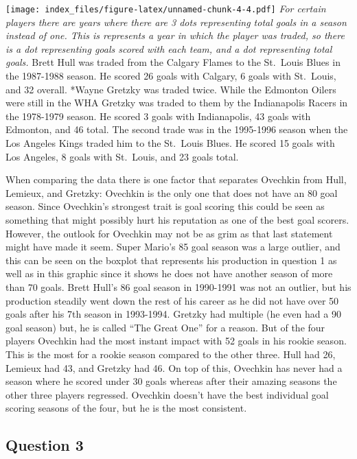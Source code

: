 \documentclass[
]{article}
\begin{document}
\texttt{[image: index\_files/figure-latex/unnamed-chunk-4-4.pdf]}
\emph{For certain players there are years where there are 3 dots
representing total goals in a season instead of one. This is represents
a year in which the player was traded, so there is a dot representing
goals scored with each team, and a dot representing total goals. }Brett
Hull was traded from the Calgary Flames to the St.~Louis Blues in the
1987-1988 season. He scored 26 goals with Calgary, 6 goals with
St.~Louis, and 32 overall. *Wayne Gretzky was traded twice. While the
Edmonton Oilers were still in the WHA Gretzky was traded to them by the
Indianapolis Racers in the 1978-1979 season. He scored 3 goals with
Indianapolis, 43 goals with Edmonton, and 46 total. The second trade was
in the 1995-1996 season when the Los Angeles Kings traded him to the
St.~Louis Blues. He scored 15 goals with Los Angeles, 8 goals with
St.~Louis, and 23 goals total.

When comparing the data there is one factor that separates Ovechkin from
Hull, Lemieux, and Gretzky: Ovechkin is the only one that does not have
an 80 goal season. Since Ovechkin's strongest trait is goal scoring this
could be seen as something that might possibly hurt his reputation as
one of the best goal scorers. However, the outlook for Ovechkin may not
be as grim as that last statement might have made it seem. Super Mario's
85 goal season was a large outlier, and this can be seen on the boxplot
that represents his production in question 1 as well as in this graphic
since it shows he does not have another season of more than 70 goals.
Brett Hull's 86 goal season in 1990-1991 was not an outlier, but his
production steadily went down the rest of his career as he did not have
over 50 goals after his 7th season in 1993-1994. Gretzky had multiple
(he even had a 90 goal season) but, he is called ``The Great One'' for a
reason. But of the four players Ovechkin had the most instant impact
with 52 goals in his rookie season. This is the most for a rookie season
compared to the other three. Hull had 26, Lemieux had 43, and Gretzky
had 46. On top of this, Ovechkin has never had a season where he scored
under 30 goals whereas after their amazing seasons the other three
players regressed. Ovechkin doesn't have the best individual goal
scoring seasons of the four, but he is the most consistent.

\hypertarget{question-3}{%
\subsection{Question 3}\label{question-3}}
\end{document}
